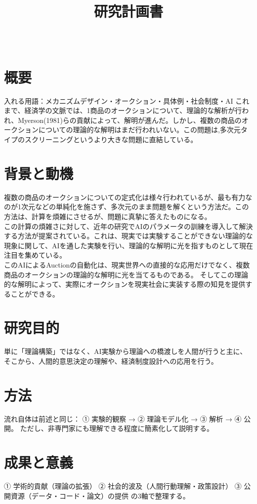 \documentclass[dvipdfmx,autodetect-engine]{article}
\title{研究計画書}
\author{\paperauthor \\ \paperaffil}
\date{\paperdate}
\begin{document}
\maketitle

\section*{概要}
入れる用語：メカニズムデザイン・オークション・具体例・社会制度・AI
これまで、経済学の文脈では、1商品のオークションについて、理論的な解析が行われ、Myerson(1981)らの貢献によって、解明が進んだ。しかし、複数の商品のオークションについての理論的な解明はまだ行われいない。この問題は,多次元タイプのスクリーニングというより大きな問題に直結している。

\section*{背景と動機}
複数の商品のオークションについての定式化は様々行われているが、最も有力なのが1次元などの単純化を施さず、多次元のまま問題を解くという方法だ。この方法は、計算を煩雑にさせるが、問題に真摯に答えたものになる。\\
この計算の煩雑さに対して、近年の研究でAIのパラメータの訓練を導入して解決する方法が提案されている。これは、現実では実験することができない理論的な現象に関して、AIを通した実験を行い、理論的な解明に光を指すものとして現在注目を集めている。\\
このAIによるAuctionの自動化は、現実世界への直接的な応用だけでなく、複数商品のオークションの理論的な解明に光を当てるものである。  
そしてこの理論的な解明によって、実際にオークションを現実社会に実装する際の知見を提供することができる。
 
\section*{研究目的}
単に「理論構築」ではなく、AI実験から理論への橋渡しを人間が行うと主に、そこから、人間的意思決定の理解や、経済制度設計への応用を行う。

\section*{方法}
流れ自体は前述と同じ：
① 実験的観察 → ② 理論モデル化 → ③ 解析 → ④ 公開。
ただし、非専門家にも理解できる程度に簡素化して説明する。

\section*{成果と意義}
① 学術的貢献（理論の拡張）
② 社会的波及（人間行動理解・政策設計）
③ 公開資源（データ・コード・論文）の提供
の3軸で整理する。
\end{document}
